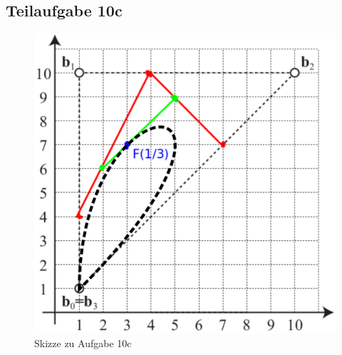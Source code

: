 \documentclass[a4paper]{scrartcl}
\begin{document}
\subsection*{Teilaufgabe 10c}
\begin{figure}[h]
    \centering
    \includegraphics*[width=0.7\linewidth, keepaspectratio]{10c-bezier.png}
    \caption{Skizze zu Aufgabe 10c}
    \label{fig:10c}
\end{figure}
\end{document}

